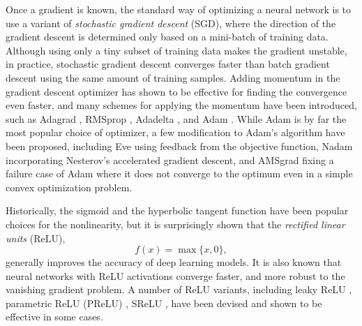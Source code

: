 Once a gradient is known, the standard way of optimizing a neural network is to use a variant of \emph{stochastic gradient descent} (SGD), where the direction of the gradient descent is determined only based on a mini-batch of training data.
Although using only a tiny subset of training data makes the gradient unstable, in practice, stochastic gradient descent converges faster than batch gradient descent using the same amount of training samples.
Adding momentum in the gradient descent optimizer has shown to be effective for finding the convergence even faster, and many schemes for applying the momentum have been introduced, such as Adagrad \cite{duchi2011adagrad}, RMSprop \cite{hinton2012rmsprop}, Adadelta \cite{zeiler2012adadelta}, and Adam \cite{kingma2015adam}.
While Adam is by far the most popular choice of optimizer, a few modification to Adam's algorithm have been proposed, including Eve \cite{koushik2016eve} using feedback from the objective function, Nadam \cite{dozat2016nadam} incorporating Nesterov's accelerated gradient descent, and AMSgrad \cite{reddi2018amsgrad} fixing a failure case of Adam where it does not converge to the optimum even in a simple convex optimization problem.

Historically, the sigmoid and the hyperbolic tangent function have been popular choices for the nonlinearity, but it is surprisingly shown \cite{nair2010relu} that the \emph{rectified linear units} (ReLU),
\begin{equation}
	f(x) = \max \{ x, 0 \},
\end{equation}
generally improves the accuracy of deep learning models.
It is also known that neural networks with ReLU activations converge faster, and more robust to the vanishing gradient problem.
A number of ReLU variants, including leaky ReLU \cite{xu2015leakyrelu}, parametric ReLU (PReLU) \cite{he2015prelu}, SReLU \cite{jin2015srelu}, have been devised and shown to be effective in some cases.


